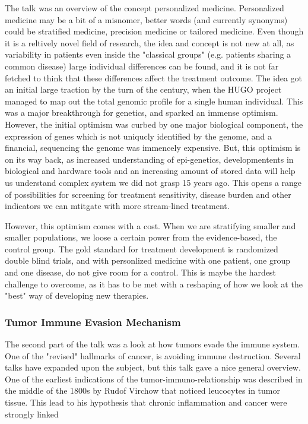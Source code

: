 \documentclass[12p]{article}
\begin{document}
The talk was an overview of the concept personalized medicine.
Personalized medicine may be a bit of a misnomer, better words (and currently synonyms) could be stratified medicine, precision medicine or tailored medicine.
Even though it is a reltively novel field of research, the idea and concept is not new at all, as variability in patients even inside the "classical groups" (e.g. patients sharing a common disease) large individual differences can be found, and it is not far fetched to think that these differences affect the treatment outcome.
The idea got an initial large traction by the turn of the century, when the HUGO project managed to map out the total genomic profile for a single human individual.
This was a major breakthrough for genetics, and sparked an immense optimism.
However, the initial optimism was curbed by one major biological component, the expression of genes which is not uniqucly identified by the genome, and a financial, sequencing the genome was immencely expensive.
But, this optimism is on its way back, as increased understanding of epi-genetics, developmentents in biological and hardware tools and an increasing amount of stored data will help us understand complex system we did not grasp 15 years ago.
This opens a range of possibilities for screening for treatment sensitivity, disease burden and other indicators we can mtitgate with more stream-lined treatment.

However, this optimism comes with a cost.
When we are stratifying smaller and smaller populations, we loose a certain power from the evidence-based, the control group.
The gold standard for treatment development is randomized double blind trials, and with personlized medicine with one patient, one group and one disease, do not give room for a control.
This is maybe the hardest challenge to overcome, as it has to be met with a reshaping of how we look at the "best" way of developing new therapies.

\subsubsection{Tumor Immune Evasion Mechanism}

The second part of the talk was a look at how tumors evade the immune system.
One of the "revised" hallmarks of cancer, is avoiding immune destruction.
Several talks have expanded upon the subject, but this talk gave a nice general overview.
One of the earliest indications of the tumor-immuno-relationship was described in the middle of the 1800s by Rudof Virchow that noticed leucocytes in tumor tissue.
This lead to his hypothesis that chronic inflammation and cancer were strongly linked 
\end{document}
